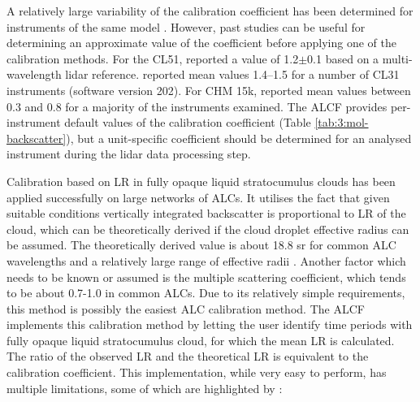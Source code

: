 \begin{table}
\caption[Theoretical molecular backscatter and the calibration coefficient]{
Theoretical molecular backscatter calculated at pressure 1000 hPa and
temperature 20\unit{^\circ C} and the calibration coefficient,
relative to the instrument native units, determined
for the instrument based on the molecular backscatter and
stratocumulus lidar ratio calibration methods.
}
\label{tab:3:mol-backscatter}
\centering
{}
\end{table}

A relatively large variability of the calibration coefficient has been determined
for instruments of the same model \citep{hopkin2019}. However, past studies
can be useful for determining an approximate value of the coefficient
before applying one of the calibration methods. For the CL51, \cite{jin2015}
reported a value of 1.2$\pm$0.1 based on a multi-wavelength lidar reference.
\cite{hopkin2019} reported mean values 1.4--1.5 for a number of CL31 instruments
(software version 202). For CHM 15k, \cite{hopkin2019} reported mean values
between 0.3 and 0.8 for a majority of the instruments examined. The ALCF provides
per-instrument default values of the calibration coefficient
(Table \ref{tab:3:mol-backscatter}), but a unit-specific coefficient should be determined
for an analysed instrument during the lidar data processing step.

Calibration based on LR in fully opaque liquid stratocumulus clouds
has been applied successfully on large networks of ALCs. It utilises the
fact that given suitable conditions vertically integrated backscatter is
proportional to LR of the cloud, which can be theoretically derived
if the cloud droplet effective radius can be assumed. The theoretically derived
value is about 18.8 sr for common ALC wavelengths and a relatively large
range of effective radii \citep{oconnor2004}. Another factor which needs to be known or assumed
is the multiple scattering coefficient, which tends to be about 0.7-1.0 in common
ALCs. Due to its relatively simple requirements, this method is possibly the
easiest ALC calibration method. The ALCF implements this calibration method by
letting the user identify time periods with fully opaque liquid stratocumulus cloud,
for which the mean LR is calculated. The ratio of the observed LR and
the theoretical LR is equivalent to the calibration coefficient. This implementation,
while very easy to perform, has multiple limitations, some of which are
highlighted by \cite{hopkin2019}:

